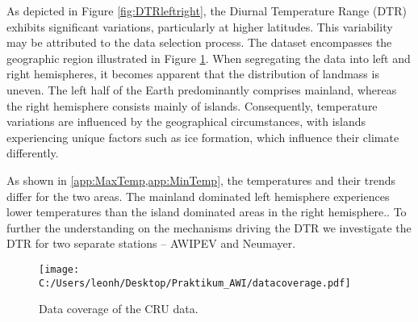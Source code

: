 
As depicted in Figure \ref{fig:DTRleftright}, the Diurnal Temperature Range (DTR) exhibits significant variations, particularly at higher
latitudes. This variability may be attributed to the data selection process. The dataset encompasses the geographic region illustrated
in Figure \ref{fig:datacoverage}. When segregating the data into left and right hemispheres, it becomes apparent that the distribution
of landmass is uneven. The left half of the Earth predominantly comprises mainland, whereas the right hemisphere consists mainly of islands.
Consequently, temperature variations are influenced by the geographical circumstances, with islands experiencing unique factors such as ice
formation, which influence their climate differently.

As shown in \cref{app:MaxTemp,app:MinTemp}, the temperatures and their trends differ for the two areas. The mainland dominated left hemisphere experiences 
lower temperatures than the island dominated areas in the right hemisphere.. To further the understanding on the mechanisms driving the DTR we investigate the DTR for two separate stations -- AWIPEV and Neumayer. 




\begin{figure}[h]
    \centering
    \texttt{[image: C:/Users/leonh/Desktop/Praktikum\_AWI/datacoverage.pdf]}
    \caption[short]{Data coverage of the CRU data.}
    \label{fig:datacoverage}
\end{figure}